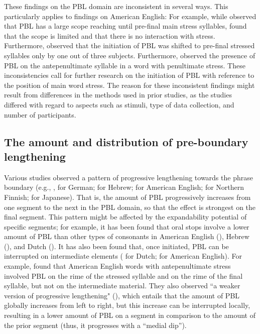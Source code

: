 \documentclass[output=paper]{langscibook}
\begin{document}
These findings on the PBL domain are inconsistent in several ways. This particularly applies to findings on American English: For example, while \citet{TurkShattuck-Hufnagel2007} observed that PBL has a large scope reaching until pre-final main stress syllables, \citet{ByrdEtal2006} found that the scope is limited and that there is no interaction with stress. Furthermore, \citet{ByrdRiggs2008} observed that the initiation of PBL was shifted to pre-final stressed syllables only by one out of three subjects. Furthermore, \citet{ChoEtal2013} observed the presence of PBL on the antepenultimate syllable in a word with penultimate stress. These inconsistencies call for further research on the initiation of PBL with reference to the position of main word stress. The reason for these inconsistent findings might result from differences in the methods used in prior studies, as the studies differed with regard to aspects such as stimuli, type of data collection, and number of participants.

\subsection{The amount and distribution of pre-boundary lengthening}\label{amount}
Various studies observed a pattern of progressive lengthening towards the phrase boundary (e.g., \citealt{Kohler1983}, \citealt{Silverman1990} for German; \cite{Berkovits1994} for Hebrew; \citealt{ByrdEtal2006} for American English; \citealt{NakaiEtal2009} for Northern Finnish; \citealt{SeoEtal2019} for Japanese). That is, the amount of PBL progressively increases from one segment to the next in the PBL domain, so that the effect is strongest on the final segment. This pattern might be affected by the expandability potential of specific segments; for example, it has been found that oral stops involve a lower amount of PBL than other types of consonants in American English (\citealt{Klatt1976}), Hebrew (\citealt{Berkovits1993a,Berkovits1993b}), and Dutch (\citealt{HofhuisEtal1995}). It has also been found that, once initiated, PBL can be interrupted on intermediate elements (\citealt{Cambier-Langeveld1997} for Dutch; \citealt{TurkShattuck-Hufnagel2007} for American English). For example, \citet{TurkShattuck-Hufnagel2007} found that American English words with antepenultimate stress involved PBL on the rime of the stressed syllable and on the rime of the final syllable, but not on the intermediate material. They also observed ``a weaker version of progressive lengthening" (\citeyear[459]{TurkShattuck-Hufnagel2007}), which entails that the amount of PBL globally increases from left to right, but this increase can be interrupted locally, resulting in a lower amount of PBL on a segment in comparison to the amount of the prior segment (thus, it progresses with a “medial dip”).
\end{document}
